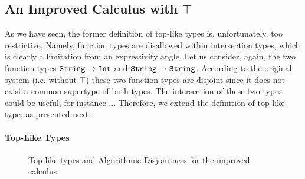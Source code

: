 \subsection{An Improved Calculus with $\top$}

As we have seen, the former definition of top-like types is, unfortunately, too restrictive.
Namely, function types are disallowed within intersection types, which is clearly a limitation from an expressivity
angle.
Let us consider, again, the two function types $\texttt{String} \to \texttt{Int}$ and $\texttt{String} \to \texttt{String}$. 
According to the original system (i.e. without $\top$) these two function types are disjoint since it does not exist
a common supertype of both types. 
The intersection of these two types could be useful, for instance ... 
Therefore, we extend the definition of top-like type, as presented next.

\paragraph{Top-Like Types}

\begin{figure}[h]


  \caption{Top-like types and Algorithmic Disjointness for the improved calculus.}
  \label{fig:disjointness}
\end{figure}


